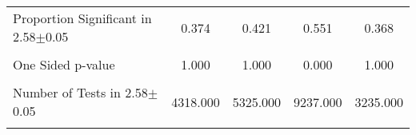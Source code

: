 {\begin{tabular}{l*{4}{c}}
                &                  &                  &                  &                  \\
\hline Proportion Significant in 2.58$\pm$0.05&    0.374         &    0.421         &    0.551         &    0.368         \\
                &                  &                  &                  &                  \\
One Sided p-value&    1.000         &    1.000         &    0.000         &    1.000         \\
                &                  &                  &                  &                  \\
Number of Tests in 2.58$\pm$0.05& 4318.000         & 5325.000         & 9237.000         & 3235.000         \\
                &                  &                  &                  &                  \\
\hline\hline
\end{tabular}
}
